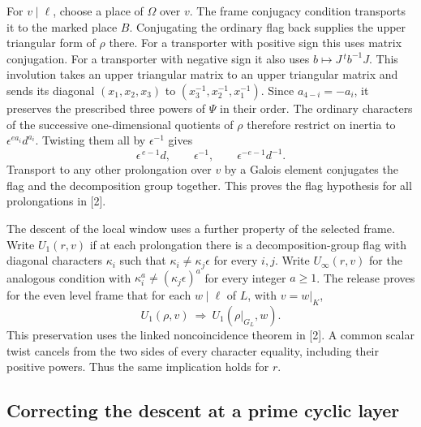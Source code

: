 For $v\mid\ell$, choose a place of $\Omega$ over $v$. The frame conjugacy condition transports it to the marked place $B$. Conjugating the ordinary flag back supplies the upper triangular form of $\rho$ there. For a transporter with positive sign this uses matrix conjugation. For a transporter with negative sign it also uses $b\mapsto J\,{}^tb^{-1}J$. This involution takes an upper triangular matrix to an upper triangular matrix and sends its diagonal $(x_1,x_2,x_3)$ to $(x_3^{-1},x_2^{-1},x_1^{-1})$. Since $a_{4-i}=-a_i$, it preserves the prescribed three powers of $\Psi$ in their order. The ordinary characters of the successive one-dimensional quotients of $\rho$ therefore restrict on inertia to $\epsilon^{ea_i}d^{a_i}$. Twisting them all by $\epsilon^{-1}$ gives
\[
        \epsilon^{\,e-1}d,\qquad
        \epsilon^{-1},\qquad
        \epsilon^{-e-1}d^{-1}.
\]
Transport to any other prolongation over $v$ by a Galois element conjugates the flag and the decomposition group together. This proves the flag hypothesis for all prolongations in [2].

The descent of the local window uses a further property of the selected frame. Write $U_1(r,v)$ if at each prolongation there is a decomposition-group flag with diagonal characters $\kappa_i$ such that $\kappa_i\ne\kappa_j\epsilon$ for every $i,j$. Write $U_\infty(r,v)$ for the analogous condition with $\kappa_i^a\ne(\kappa_j\epsilon)^a$ for every integer $a\ge1$. The release proves for the even level frame that for each $w\mid\ell$ of $L$, with $v=w|_K$,
\[
             U_1(\rho,v)\ \Longrightarrow\
                     U_1(\rho|_{G_L},w).
\]
This preservation uses the linked noncoincidence theorem in [2]. A common scalar twist cancels from the two sides of every character equality, including their positive powers. Thus the same implication holds for $r$.

\subsection{Correcting the descent at a prime cyclic layer}

